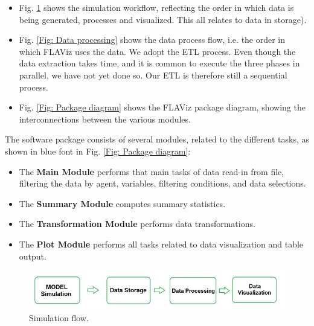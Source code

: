 \documentclass[10pt,a4paper]{article}
\begin{document}
\begin{itemize}
\item Fig. \ref{Fig: Simulation workflow} shows the simulation workflow, reflecting the order in which data is being generated, processes and visualized. This all relates to data in storage).

\item Fig. \ref{Fig: Data processing} shows the data process flow, i.e. the order in which FLAViz uses the data. We adopt the ETL process. Even though the data extraction takes time, and it is common to execute the three phases in parallel, we have not yet done so. Our ETL is therefore still a sequential process.

\item Fig. \ref{Fig: Package diagram} shows the FLAViz package diagram, showing the interconnections between the various modules.
\end{itemize}

The software package consists of several modules, related to the different tasks, as shown in blue font in Fig. \ref{Fig: Package diagram}:

\begin{itemize}
\item The \textbf{Main Module} performs that main tasks of data read-in from file, filtering the data by agent, variables, filtering conditions, and data selections.

\item The \textbf{Summary Module} computes summary statistics.

\item The \textbf{Transformation Module} performs data transformations.

\item The \textbf{Plot Module} performs all tasks related to data visualization and table output.
\end{itemize}


\begin{figure}
\graphicspath{{./png/}}
%
\begin{boxedminipage}{14cm}
\centering\leavevmode
\includegraphics[scale=1]{simulation_workflow.pdf} 
\end{boxedminipage}
\label{Fig: Simulation workflow}
\caption{\footnotesize Simulation flow.}
\end{figure}
\end{document}
